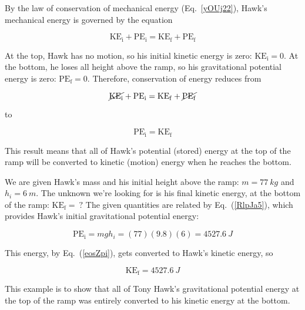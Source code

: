 \documentclass[main.tex]{subfiles}
\begin{document}
\Solution By the law of conservation of mechanical energy (Eq.~\ref{yOUj22}), Hawk's mechanical energy is governed by the equation

\begin{equation*} 
    \mathrm{KE_i} + \mathrm{PE_i} = \mathrm{KE_f} + \mathrm{PE_f}
\end{equation*}

At the top, Hawk has no motion, so his initial kinetic energy is zero: $\mathrm{KE_i} = 0$. At the bottom, he loses all height above the ramp, so his gravitational potential energy is zero: $\mathrm{PE_f} = 0$. Therefore, conservation of energy reduces from

\begin{equation*}
        \cancel{\mathrm{KE_i}} + \mathrm{PE_i} = \mathrm{KE_f} + \cancel{\mathrm{PE_f}}
\end{equation*}

to

\begin{equation} \label{eosZpi}
    \mathrm{PE_i} = \mathrm{KE_f}
\end{equation}

This result means that all of Hawk's potential (stored) energy at the top of the ramp will be converted to kinetic (motion) energy when he reaches the bottom.
\vspace{1em}

We are given Hawk's mass and his initial height above the ramp: $m = \SI{77}{kg}$ and $h_i = \SI{6}{m}$. The unknown we're looking for is his final kinetic energy, at the bottom of the ramp: $\mathrm{KE_f} =\ ?$ The given quantities are related by Eq.~(\ref{RlpJa5}), which provides Hawk's initial gravitational potential energy:

\begin{equation*}
    \mathrm{PE_i} = mgh_i = (77)(9.8)(6) = \SI{4527.6}{J} 
\end{equation*}

This energy, by Eq.~(\ref{eosZpi}), gets converted to Hawk's kinetic energy, so

\begin{equation*}
    \mathrm{KE_f} = \SI{4527.6}{J} 
\end{equation*}

This example is to show that all of Tony Hawk's gravitational potential energy at the top of the ramp was entirely converted to his kinetic energy at the bottom.

\solutionEnd

\vspace{1em}
\end{document}
